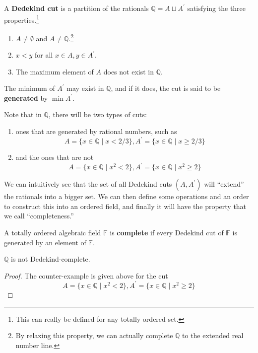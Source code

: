     \begin{definition} 
      A \textbf{Dedekind cut} is a partition of the rationals $\mathbb{Q} = A \sqcup A^\prime$ satisfying the three properties.\footnote{This can really be defined for any totally ordered set. } 
      \begin{enumerate}
        \item $A \neq \emptyset$ and $A \neq \mathbb{Q}$.\footnote{By relaxing this property, we can actually complete $\mathbb{Q}$ to the extended real number line. }
        \item $x < y$ for all $x \in A, y \in A^\prime$. 
        \item The maximum element of $A$ does not exist in $\mathbb{Q}$. 
      \end{enumerate}
      The minimum of $A^\prime$ may exist in $\mathbb{Q}$, and if it does, the cut is said to be \textbf{generated} by $\min A^\prime$. 
    \end{definition}

    Note that in $\mathbb{Q}$, there will be two types of cuts: 
    \begin{enumerate}
      \item ones that are generated by rational numbers, such as 
      \begin{equation}
        A = \{x \in \mathbb{Q} \mid x < 2/3 \}, A^\prime = \{ x \in \mathbb{Q} \mid x \geq 2/3 \} 
      \end{equation}
      \item and the ones that are not 
      \begin{equation}
        A = \{x \in \mathbb{Q} \mid x^2 < 2 \}, A^\prime = \{x \in \mathbb{Q} \mid x^2 \geq 2 \}
      \end{equation}
    \end{enumerate}
    We can intuitively see that the set of all Dedekind cuts $(A, A^\prime)$ will ``extend'' the rationals into a bigger set. We can then define some operations and an order to construct this into an ordered field, and finally it will have the property that we call ``completeness.''

    \begin{definition}
      A totally ordered algebraic field $\mathbb{F}$ is \textbf{complete} if every Dedekind cut of $\mathbb{F}$ is generated by an element of $\mathbb{F}$. 
    \end{definition} 

    \begin{theorem}
      $\mathbb{Q}$ is not Dedekind-complete. 
    \end{theorem}
    \begin{proof}
      The counter-example is given above for the cut 
      \begin{equation}
        A = \{x \in \mathbb{Q} \mid x^2 < 2 \}, A^\prime = \{x \in \mathbb{Q} \mid x^2 \geq 2 \}
      \end{equation}
    \end{proof} 

